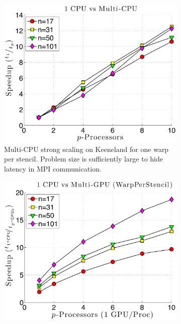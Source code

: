 \begin{figure}
\centering
\begin{subfigure}[t]{0.425\textwidth}
\centering
\includegraphics[width=1.0\textwidth]{../figures/keeneland_results/alltoallv_cosine/speedup_1CPU_vs_NCPU.pdf}
\caption{Multi-CPU strong scaling on Keeneland for one warp per stencil. Problem size is sufficiently large to hide latency in MPI communication.}
\label{fig:alltoall_multicpu_scaling}
\end{subfigure} 
\begin{subfigure}[t]{0.425\textwidth}
\centering
\includegraphics[width=1.0\textwidth]{../figures/keeneland_results/alltoallv_cosine/speedup_1CPU_vs_NGPU_WarpPerStencil.pdf}

\end{subfigure}
\end{figure}

